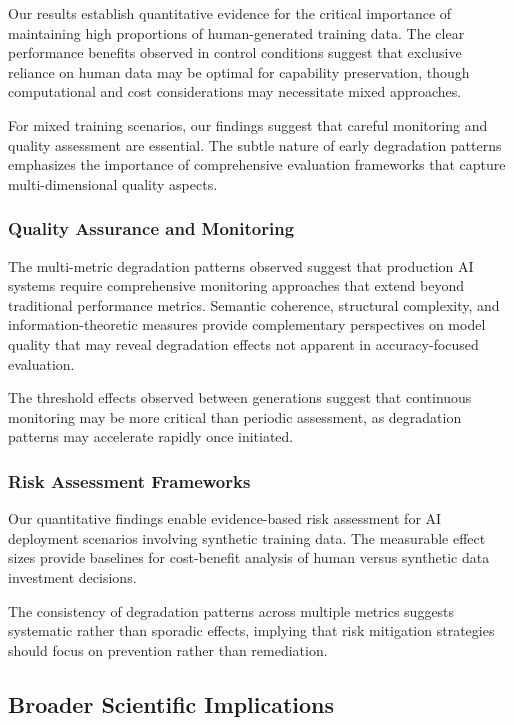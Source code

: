 \documentclass[11pt]{article}
\begin{document}
Our results establish quantitative evidence for the critical importance of maintaining high proportions of human-generated training data. The clear performance benefits observed in control conditions suggest that exclusive reliance on human data may be optimal for capability preservation, though computational and cost considerations may necessitate mixed approaches.

For mixed training scenarios, our findings suggest that careful monitoring and quality assessment are essential. The subtle nature of early degradation patterns emphasizes the importance of comprehensive evaluation frameworks that capture multi-dimensional quality aspects.

\subsubsection{Quality Assurance and Monitoring}

The multi-metric degradation patterns observed suggest that production AI systems require comprehensive monitoring approaches that extend beyond traditional performance metrics. Semantic coherence, structural complexity, and information-theoretic measures provide complementary perspectives on model quality that may reveal degradation effects not apparent in accuracy-focused evaluation.

The threshold effects observed between generations suggest that continuous monitoring may be more critical than periodic assessment, as degradation patterns may accelerate rapidly once initiated.

\subsubsection{Risk Assessment Frameworks}

Our quantitative findings enable evidence-based risk assessment for AI deployment scenarios involving synthetic training data. The measurable effect sizes provide baselines for cost-benefit analysis of human versus synthetic data investment decisions.

The consistency of degradation patterns across multiple metrics suggests systematic rather than sporadic effects, implying that risk mitigation strategies should focus on prevention rather than remediation.

\subsection{Broader Scientific Implications}
\end{document}

